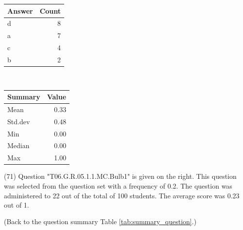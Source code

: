 \documentclass[12pt,nohyper]{tufte-handout}\usepackage[]{graphicx}\usepackage[]{color}
\begin{document}
\begin{center}%
\begin{tabular}{lr}
  \hline
Answer & Count \\ 
  \hline
d &   8 \\ 
  a &   7 \\ 
  c &   4 \\ 
  b &   2 \\ 
   \hline
\end{tabular}
~~~~~~~~%
\begin{tabular}{lr}
  \hline
Summary & Value \\ 
  \hline
Mean & 0.33 \\ 
  Std.dev & 0.48 \\ 
  Min & 0.00 \\ 
  Median & 0.00 \\ 
  Max & 1.00 \\ 
   \hline
\end{tabular}
\end{center}\newpage{} (71) Question "T06.G.R.05.1.1.MC.Bulb1" is given on the right. This question was selected from the question set with a frequency of 0.2. The question was administered to 22 out of the total of 100 students. The average score was 0.23 out of 1.

 (Back to the question summary Table \ref{tab:summary_question}.)
\end{document}
